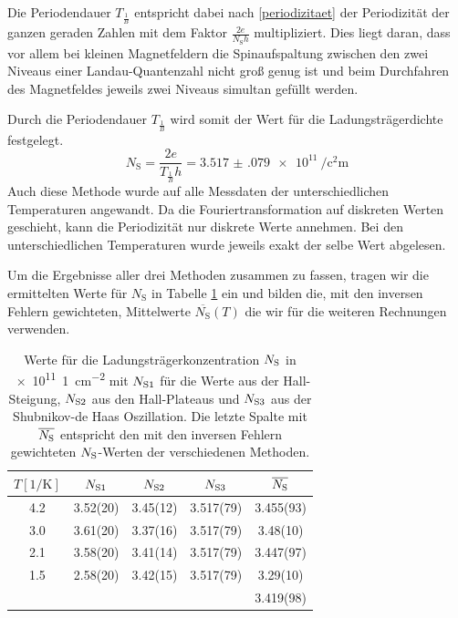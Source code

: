 \documentclass[paper=a4,fontsize=10pt,DIV=18,twocolumn,parskip=half]{scrartcl}
\numberwithin{equation}{section}    %
\newcommand{\kor}[1]{{\color{darkgreen}#1}}
\begin{document}
Die Periodendauer $T_{\frac{1}{B}}$ entspricht dabei nach \eqref{periodizitaet} der Periodizität der ganzen geraden Zahlen mit dem Faktor $\frac{2 e}{N_\mathrm{S} h}$ multipliziert. Dies liegt daran, dass vor allem bei kleinen Magnetfeldern die Spinaufspaltung zwischen den zwei Niveaus einer Landau-Quantenzahl nicht groß genug ist und beim Durchfahren des Magnetfeldes jeweils zwei Niveaus simultan gefüllt werden.

Durch die Periodendauer $T_{\frac{1}{B}}$ wird somit der Wert für die Ladungsträgerdichte festgelegt.
\begin{equation}
N_\mathrm{S}=\frac{2 e}{T_{\frac{1}{B}} h}=\SI{3.517(079)e11}{\per\square\centi\meter}
\label{ns_periode}
\end{equation}
Auch diese Methode wurde auf alle Messdaten der unterschiedlichen Temperaturen angewandt. Da die Fouriertransformation auf diskreten Werten geschieht, kann die Periodizität nur diskrete Werte annehmen. Bei den unterschiedlichen Temperaturen wurde jeweils exakt der selbe Wert abgelesen.

Um die Ergebnisse aller drei Methoden zusammen zu fassen, tragen wir die ermittelten Werte für $N_\mathrm{S}$ in Tabelle \ref{nswerte} ein und bilden die, mit den inversen Fehlern gewichteten, Mittelwerte $\overline{N_\mathrm{S}}(T)$ die wir für die weiteren Rechnungen verwenden.

\begin{table}[htp]
	\begin{center}
		\begin{tabular}{ccccc}
			\hline
			$T[1/\mathrm{K}]$ & $N_{\rm S1}$ & $N_{\rm S2}$ & $N_{\rm S3}$ & $\overline{N_{\rm S}}$\\
			\hline
			4.2 & 3.52(20) & \kor{3.45(12)} & 3.517(79) & 3.455(93)\\
			3.0 & 3.61(20) & \kor{3.37(16)} & 3.517(79) & 3.48(10)\\
			2.1 & 3.58(20) & \kor{3.41(14)} & 3.517(79) & 3.447(97)\\
			1.5 & 2.58(20) & \kor{3.42(15)} & 3.517(79) & 3.29(10)\\
			\hline
			\hline
			 &  &  &  &3.419(98)\\
		\end{tabular}
		\caption{Werte für die Ladungsträgerkonzentration $N_{\rm S}$ in \SI[per-mode=symbol]{e11}{1\per\centi\meter\squared} mit $N_{\rm S1}$ für die Werte aus der Hall-Steigung, $N_{\rm S2}$ aus den Hall-Plateaus und $N_{\rm S3}$ aus der Shubnikov-de Haas Oszillation. Die letzte Spalte mit $\overline{N_{\rm S}}$ entspricht den mit den inversen Fehlern gewichteten $N_{\rm S}$-Werten der verschiedenen Methoden.}
		\label{nswerte}
	\end{center}
\end{table}
\end{document}
